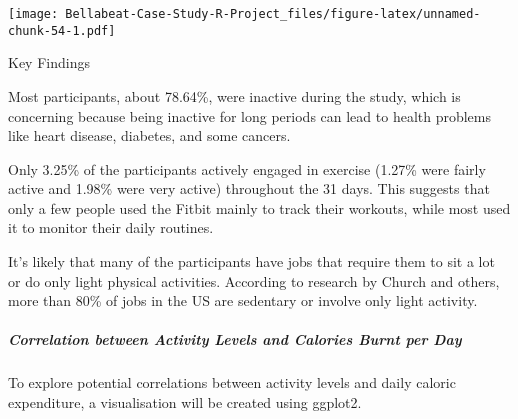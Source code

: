 \documentclass[
]{article}
\begin{document}
\texttt{[image: Bellabeat-Case-Study-R-Project\_files/figure-latex/unnamed-chunk-54-1.pdf]}

Key Findings

Most participants, about 78.64\%, were inactive during the study, which
is concerning because being inactive for long periods can lead to health
problems like heart disease, diabetes, and some cancers.

Only 3.25\% of the participants actively engaged in exercise (1.27\%
were fairly active and 1.98\% were very active) throughout the 31 days.
This suggests that only a few people used the Fitbit mainly to track
their workouts, while most used it to monitor their daily routines.

It's likely that many of the participants have jobs that require them to
sit a lot or do only light physical activities. According to research by
Church and others, more than 80\% of jobs in the US are sedentary or
involve only light activity.

\hypertarget{correlation-between-activity-levels-and-calories-burnt-per-day}{%
\subparagraph{Correlation between Activity Levels and Calories Burnt per
Day}\label{correlation-between-activity-levels-and-calories-burnt-per-day}}

To explore potential correlations between activity levels and daily
caloric expenditure, a visualisation will be created using ggplot2.
\end{document}
